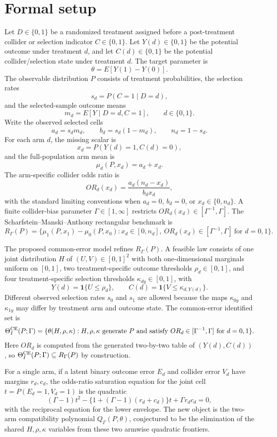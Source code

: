 \documentclass[11pt]{article}
\newcommand{\one}{\mathbf{1}}
\theoremstyle{definition}
\theoremstyle{plain}
\theoremstyle{remark}
\begin{document}
\section{Formal setup}
Let \(D\in\{0,1\}\) be a randomized treatment assigned before a post-treatment collider or selection indicator \(C\in\{0,1\}\).  Let \(Y(d)\in\{0,1\}\) be the potential outcome under treatment \(d\), and let \(C(d)\in\{0,1\}\) be the potential collider/selection state under treatment \(d\).  The target parameter is
\[
  \theta = E[Y(1)-Y(0)].
\]
The observable distribution \(P\) consists of treatment probabilities, the selection rates
\[
  s_d=P(C=1\mid D=d),
\]
and the selected-sample outcome means
\[
  m_d=E[Y\mid D=d,C=1], \qquad d\in\{0,1\}.
\]
Write the observed selected cells
\[
  a_d=s_dm_d,\qquad b_d=s_d(1-m_d),\qquad n_d=1-s_d.
\]
For each arm \(d\), the missing scalar is
\[
  x_d=P(Y(d)=1,C(d)=0),
\]
and the full-population arm mean is
\[
  \mu_d(P,x_d)=a_d+x_d.
\]
The arm-specific collider odds ratio is
\[
  OR_d(x_d)=
  \frac{a_d(n_d-x_d)}{b_dx_d},
\]
with the standard limiting conventions when \(a_d=0\), \(b_d=0\), or \(x_d\in\{0,n_d\}\).  A finite collider-bias parameter \(\Gamma\in[1,\infty]\) restricts \(OR_d(x_d)\in[\Gamma^{-1},\Gamma]\).  The Scharfstein--Manski--Anthony rectangular benchmark is
\[
  R_\Gamma(P)=
  \{\mu_1(P,x_1)-\mu_0(P,x_0): x_d\in[0,n_d],\
  OR_d(x_d)\in[\Gamma^{-1},\Gamma]\ \text{for }d=0,1\}.
\]

The proposed common-error model refines \(R_\Gamma(P)\).  A feasible law consists of one joint distribution \(H\) of \((U,V)\in[0,1]^2\) with both one-dimensional marginals uniform on \([0,1]\), two treatment-specific outcome thresholds \(\rho_d\in[0,1]\), and four treatment-specific selection thresholds \(\kappa_{dy}\in[0,1]\), with
\[
  Y(d)=\one\{U\le \rho_d\},\qquad
  C(d)=\one\{V\le \kappa_{d,Y(d)}\}.
\]
Different observed selection rates \(s_0\) and \(s_1\) are allowed because the maps \(\kappa_{0y}\) and \(\kappa_{1y}\) may differ by treatment arm and outcome state.  The common-error identified set is
\[
  \Theta_I^{\rm CE}(P;\Gamma)=
  \{\theta(H,\rho,\kappa): H,\rho,\kappa\ \text{generate }P
  \text{ and satisfy } OR_d\in[\Gamma^{-1},\Gamma]\ \text{for }d=0,1\}.
\]
Here \(OR_d\) is computed from the generated two-by-two table of \((Y(d),C(d))\), so \(\Theta_I^{\rm CE}(P;\Gamma)\subseteq R_\Gamma(P)\) by construction.

For a single arm, if a latent binary outcome error \(E_d\) and collider error \(V_d\) have margins \(r_d,c_d\), the odds-ratio saturation equation for the joint cell \(t=P(E_d=1,V_d=1)\) is the quadratic
\[
  (\Gamma-1)t^2-\{1+(\Gamma-1)(r_d+c_d)\}t+\Gamma r_dc_d=0,
\]
with the reciprocal equation for the lower envelope.  The new object is the two-arm compatibility polynomial \(Q_\Gamma(P,\theta)\), conjectured to be the elimination of the shared \(H,\rho,\kappa\) variables from these two armwise quadratic frontiers.
\end{document}
